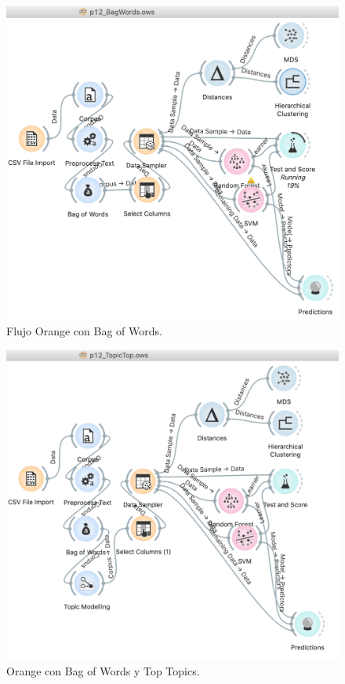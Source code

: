 \documentclass[runningheads]{llncs}
\begin{document}
\begin{figure}[H]
    \center
    \includegraphics[width=1\linewidth]{resources/BagWordsFlow.png}
    \caption{ Flujo Orange con Bag of Words.}
    \label{fig:1}
\end{figure}
\begin{figure}[H]
    \includegraphics[width=1\linewidth]{resources/TopicTopFlow.png}
    \caption{  Orange con Bag of Words y Top Topics.}
    \label{fig:2}
\end{figure}
\end{document}
